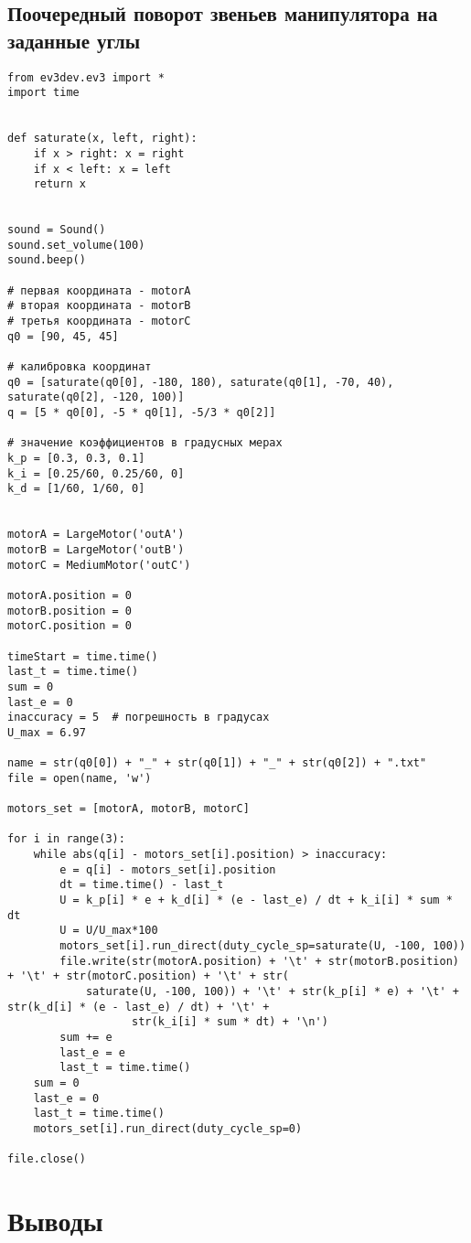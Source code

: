 \documentclass{article}
\begin{document}
\subsection{Поочередный поворот звеньев манипулятора на заданные углы}
\begin{verbatim}
from ev3dev.ev3 import *
import time


def saturate(x, left, right):
    if x > right: x = right
    if x < left: x = left
    return x


sound = Sound()
sound.set_volume(100)
sound.beep()

# первая координата - motorA
# вторая координата - motorB
# третья координата - motorC
q0 = [90, 45, 45]

# калибровка координат
q0 = [saturate(q0[0], -180, 180), saturate(q0[1], -70, 40), saturate(q0[2], -120, 100)]
q = [5 * q0[0], -5 * q0[1], -5/3 * q0[2]]

# значение коэффициентов в градусных мерах
k_p = [0.3, 0.3, 0.1]
k_i = [0.25/60, 0.25/60, 0]
k_d = [1/60, 1/60, 0]


motorA = LargeMotor('outA')
motorB = LargeMotor('outB')
motorC = MediumMotor('outC')

motorA.position = 0
motorB.position = 0
motorC.position = 0

timeStart = time.time()
last_t = time.time()
sum = 0
last_e = 0
inaccuracy = 5  # погрешность в градусах
U_max = 6.97

name = str(q0[0]) + "_" + str(q0[1]) + "_" + str(q0[2]) + ".txt"
file = open(name, 'w')

motors_set = [motorA, motorB, motorC]

for i in range(3):
    while abs(q[i] - motors_set[i].position) > inaccuracy:
        e = q[i] - motors_set[i].position
        dt = time.time() - last_t
        U = k_p[i] * e + k_d[i] * (e - last_e) / dt + k_i[i] * sum * dt
        U = U/U_max*100
        motors_set[i].run_direct(duty_cycle_sp=saturate(U, -100, 100))
        file.write(str(motorA.position) + '\t' + str(motorB.position) + '\t' + str(motorC.position) + '\t' + str(
            saturate(U, -100, 100)) + '\t' + str(k_p[i] * e) + '\t' + str(k_d[i] * (e - last_e) / dt) + '\t' +
                   str(k_i[i] * sum * dt) + '\n')
        sum += e
        last_e = e
        last_t = time.time()
    sum = 0
    last_e = 0
    last_t = time.time()
    motors_set[i].run_direct(duty_cycle_sp=0)

file.close()
\end{verbatim}

\section{Выводы}
\end{document}
